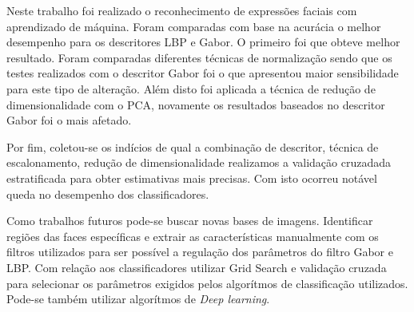 Neste trabalho foi realizado o reconhecimento de expressões faciais com aprendizado de máquina. Foram comparadas com base na acurácia o melhor desempenho para os descritores LBP e Gabor. O primeiro foi que obteve melhor resultado. Foram comparadas diferentes técnicas de normalização sendo que os testes realizados com o descritor Gabor foi o que apresentou maior sensibilidade para este tipo de alteração. Além disto foi aplicada a técnica de redução de dimensionalidade com o PCA, novamente os resultados baseados no descritor Gabor foi o mais afetado.

Por fim, coletou-se os indícios de qual a combinação de descritor, técnica de escalonamento, redução de dimensionalidade realizamos a validação cruzadada estratificada para obter estimativas mais precisas. Com isto ocorreu notável queda no desempenho dos classificadores.

Como trabalhos futuros pode-se buscar novas bases de imagens. Identificar regiões das faces específicas e extrair as características manualmente com os filtros utilizados para ser possível a regulação dos parâmetros do filtro Gabor e LBP. Com relação aos classificadores utilizar Grid Search e validação cruzada para selecionar os parâmetros exigidos pelos algorítmos de classificação utilizados. Pode-se também utilizar algorítmos de \textit{Deep learning}.
